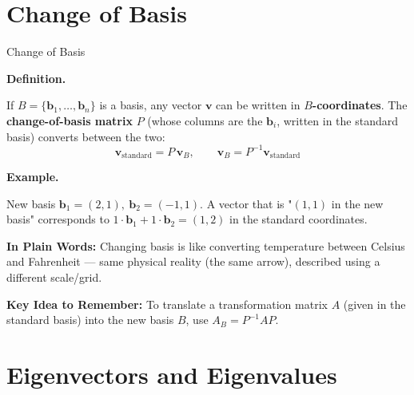 \documentclass[9pt,aspectratio=169]{beamer}
\newcommand{\keyidea}[1]{%
\par\medskip\noindent\textbf{Key Idea to Remember:} #1\par\medskip}
\newcommand{\childex}[1]{%
\par\medskip\noindent\textbf{In Plain Words:} #1\par\medskip}
\begin{document}
\section{Change of Basis}

\begin{frame}{Change of Basis}
\par\noindent\textbf{Definition.}\par
If $B=\{\mathbf{b}_1,\dots,\mathbf{b}_n\}$ is a basis, any vector $\mathbf{v}$ can be
written in \textbf{$B$-coordinates}. The \textbf{change-of-basis matrix} $P$ (whose
columns are the $\mathbf{b}_i$, written in the standard basis) converts between the two:
\[ \mathbf{v}_{\text{standard}} = P\,\mathbf{v}_{B}, \qquad
\mathbf{v}_{B} = P^{-1}\mathbf{v}_{\text{standard}} \]
\medskip


\par\noindent\textbf{Example.}\par
New basis $\mathbf{b}_1=(2,1),\ \mathbf{b}_2=(-1,1)$. A vector that is "$(1,1)$ in the new
basis" corresponds to $1\cdot\mathbf{b}_1 + 1\cdot\mathbf{b}_2 = (1,2)$ in the standard
coordinates.
\medskip


\childex{Changing basis is like converting temperature between Celsius and Fahrenheit ---
same physical reality (the same arrow), described using a different scale/grid.}

\keyidea{To translate a transformation matrix $A$ (given in the standard basis) into the
new basis $B$, use $A_B = P^{-1}AP$.}
\end{frame}

\section{Eigenvectors and Eigenvalues}
\end{document}
